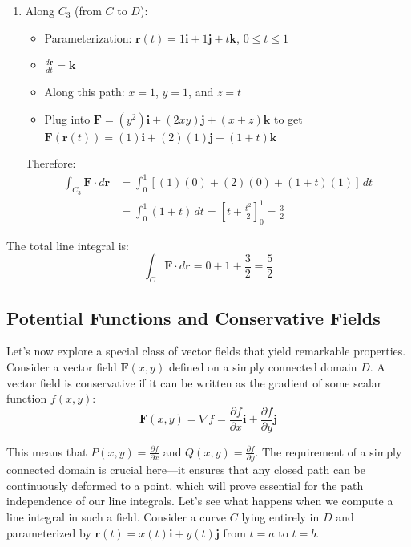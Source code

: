 \begin{example}
\begin{solution}
\begin{enumerate}
\item Along $C_3$ (from $C$ to $D$):
\begin{itemize}
    \item Parameterization: $\mathbf{r}(t) = 1\mathbf{i} + 1\mathbf{j} + t\mathbf{k}$, $0 \leq t \leq 1$
    \item $\frac{d\mathbf{r}}{dt} = \mathbf{k}$
    \item Along this path: $x=1$, $y=1$, and $z=t$
    \item Plug into $\mathbf{F} = (y^2)\mathbf{i} + (2xy)\mathbf{j} + (x+z)\mathbf{k}$ to get $\mathbf{F}(\mathbf{r}(t)) = (1)\mathbf{i} + (2)(1)\mathbf{j} + (1+t)\mathbf{k}$
\end{itemize}
Therefore:
\begin{align*}
\int_{C_3} \mathbf{F}\cdot d\mathbf{r} &= \int_0^1 [(1)(0) + (2)(0) + (1+t)(1)]\,dt \\
&= \int_0^1 (1+t)\,dt = [t + \frac{t^2}{2}]_0^1 = \frac{3}{2}
\end{align*}
\end{enumerate}

The total line integral is:
\[
\int_C \mathbf{F}\cdot d\mathbf{r} = 0 + 1 + \frac{3}{2} = \frac{5}{2}
\]
\end{solution}
\end{example}
\exampleline

\subsection*{Potential Functions and Conservative Fields}

\noindent Let's now explore a special class of vector fields that yield remarkable properties. Consider a vector field $\mathbf{F}(x,y)$ defined on a simply connected domain $D$. A vector field is conservative if it can be written as the gradient of some scalar function $f(x,y)$:
\[
\mathbf{F}(x,y) = \nabla f = \frac{\partial f}{\partial x}\mathbf{i} + \frac{\partial f}{\partial y}\mathbf{j}
\]

\noindent This means that $P(x,y) = \frac{\partial f}{\partial x}$ and $Q(x,y) = \frac{\partial f}{\partial y}$. The requirement of a simply connected domain is crucial here—it ensures that any closed path can be continuously deformed to a point, which will prove essential for the path independence of our line integrals. Let's see what happens when we compute a line integral in such a field. Consider a curve $C$ lying entirely in $D$ and parameterized by $\mathbf{r}(t) = x(t)\mathbf{i} + y(t)\mathbf{j}$ from $t=a$ to $t=b$. \\

